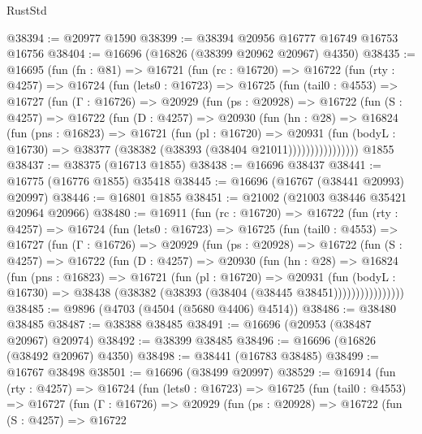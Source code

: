 \begin{lexlean}{RustStd}
\begin{coremodule}
@38394 := @20977 @1590
@38399 := @38394 @20956 @16777 @16749 @16753 @16756
@38404 := @16696 (@16826 (@38399 @20962 @20967) @4350)
@38435 := @16695
    (fun (fn : @81) =>
    @16721
      (fun (rc : @16720) =>
      @16722
        (fun (rty : @4257) =>
        @16724
          (fun (lets0 : @16723) =>
          @16725
            (fun (tail0 : @4553) =>
            @16727
              (fun (Γ : @16726) =>
              @20929
                (fun (ps : @20928) =>
                @16722
                  (fun (S : @4257) =>
                  @16722
                    (fun (D : @4257) =>
                    @20930
                      (fun (hn : @28) =>
                      @16824
                        (fun (pns : @16823) =>
                        @16721
                          (fun (pl : @16720) =>
                          @20931
                            (fun (bodyL : @16730) =>
                            @38377 (@38382 (@38393 (@38404 @21011))))))))))))))))
    @1855
@38437 := @38375 (@16713 @1855)
@38438 := @16696 @38437
@38441 := @16775 (@16776 @1855) @35418
@38445 := @16696 (@16767 (@38441 @20993) @20997)
@38446 := @16801 @1855
@38451 := @21002 (@21003 @38446 @35421 @20964 @20966)
@38480 := @16911
    (fun (rc : @16720) =>
    @16722
      (fun (rty : @4257) =>
      @16724
        (fun (lets0 : @16723) =>
        @16725
          (fun (tail0 : @4553) =>
          @16727
            (fun (Γ : @16726) =>
            @20929
              (fun (ps : @20928) =>
              @16722
                (fun (S : @4257) =>
                @16722
                  (fun (D : @4257) =>
                  @20930
                    (fun (hn : @28) =>
                    @16824
                      (fun (pns : @16823) =>
                      @16721
                        (fun (pl : @16720) =>
                        @20931
                          (fun (bodyL : @16730) =>
                          @38438 (@38382 (@38393 (@38404 (@38445 @38451))))))))))))))))
@38485 := @9896 (@4703 (@4504 (@5680 @4406) @4514))
@38486 := @38480 @38485
@38487 := @38388 @38485
@38491 := @16696 (@20953 (@38487 @20967) @20974)
@38492 := @38399 @38485
@38496 := @16696 (@16826 (@38492 @20967) @4350)
@38498 := @38441 (@16783 @38485)
@38499 := @16767 @38498
@38501 := @16696 (@38499 @20997)
@38529 := @16914
    (fun (rty : @4257) =>
    @16724
      (fun (lets0 : @16723) =>
      @16725
        (fun (tail0 : @4553) =>
        @16727
          (fun (Γ : @16726) =>
          @20929
            (fun (ps : @20928) =>
            @16722
              (fun (S : @4257) =>
              @16722

\end{coremodule}
\end{lexlean}
